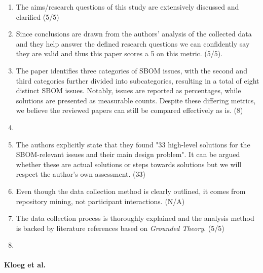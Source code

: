 \begin{enumerate}
    \item The aims/research questions of this study are extensively discussed and clarified (5/5)
    \item Since conclusions are drawn from the authors' analysis of the collected data and they help answer the defined research questions we can confidently say they are valid and thus this paper scores a 5 on this metric. (5/5).
    \item The paper identifies three categories of SBOM issues, with the second and third categories further divided into subcategories, resulting in a total of eight distinct SBOM issues. Notably, issues are reported as percentages, while solutions are presented as measurable counts. Despite these differing metrics, we believe the reviewed papers can still be compared effectively as is. (8)
    \item
    \item The authors explicitly state that they found "33 high-level solutions for the SBOM-relevant issues and their main design problem". It can be argued whether these are actual solutions or steps towards solutions but we will respect the author's own assessment. (33)
    \item Even though the data collection method is clearly outlined, it comes from repository mining, not participant interactions. (N/A)
    \item The data collection process is thoroughly explained and the analysis method is backed by literature references based on \emph{Grounded Theory}. (5/5)
    \item
\end{enumerate}

\paragraph{Kloeg et al. \cite{article:business-sbom}}

